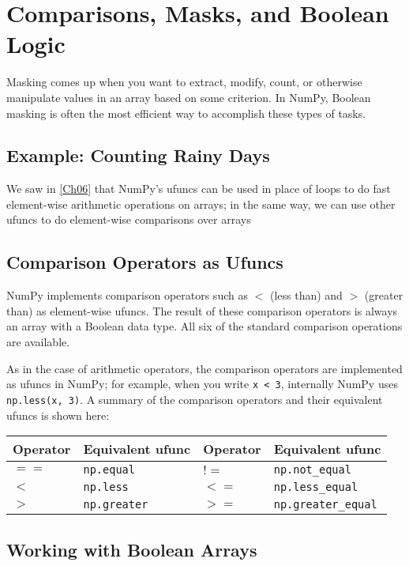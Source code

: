 \chapter{Comparisons, Masks, and Boolean Logic}
Masking comes up when you want to extract, modify, count, or
otherwise manipulate values in an array based on some criterion.
In NumPy, Boolean masking is often the most efficient
way to accomplish these types of tasks.
\section{Example: Counting Rainy Days}

We saw in \autoref{Ch06} that NumPy's ufuncs can be used in place of loops to do
fast element-wise arithmetic operations on arrays; in the same way, we can use other
ufuncs to do element-wise comparisons over arrays
\section{Comparison Operators as Ufuncs}

NumPy implements comparison operators such as $<$ (less than) and $>$
(greater than) as element-wise ufuncs. The result of these comparison operators is
always an array with a Boolean data type. All six of the standard comparison operations are available.

As in the case of arithmetic operators, the comparison operators are implemented as
ufuncs in NumPy; for example, when you write \verb|x < 3|, internally NumPy uses
\verb|np.less(x, 3)|. A summary of the comparison operators and their equivalent ufuncs
is shown here:

\begin{table}[H]
    \centering
    \begin{tabular}{llll}
        \hline
        Operator & Equivalent ufunc  & Operator & Equivalent ufunc        \\
        \hline
        $==$     & \verb|np.equal|   & $!=$     & \verb|np.not_equal|     \\
        $<$      & \verb|np.less|    & $<=$     & \verb|np.less_equal|    \\
        $>$      & \verb|np.greater| & $>=$     & \verb|np.greater_equal| \\
        \hline
    \end{tabular}
\end{table}
\section{Working with Boolean Arrays}
